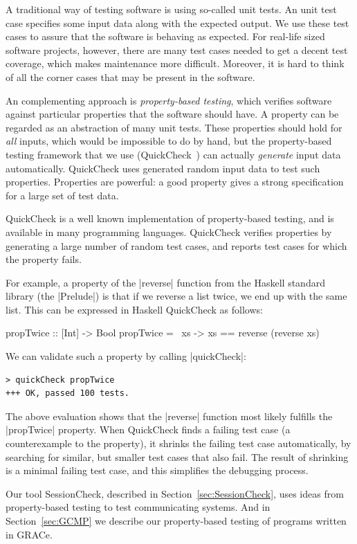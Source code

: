 \documentclass{article}
\begin{document}
A traditional way of testing software is using so-called unit tests.
%
An unit test case specifies some input data along with the expected
output.
%
We use these test cases to assure that the software is behaving as
expected.
%
For real-life sized software projects, however, there are many test
cases needed to get a decent test coverage, which makes maintenance
more difficult.
%
Moreover, it is hard to think of all the corner cases that may be
present in the software.

An complementing approach is \emph{property-based testing}, which
verifies software against particular properties that the software
should have.
%
A property can be regarded as an abstraction of many unit tests.
%
These properties should hold for \emph{all} inputs, which would be
impossible to do by hand, but the property-based testing framework
that we use (QuickCheck~\cite{QuickCheck}) can actually
\emph{generate} input data automatically.
%
QuickCheck uses generated random input data to test such properties.
%
Properties are powerful: a good property gives a strong specification
for a large set of test data.

QuickCheck is a well known implementation of property-based testing,
and is available in many programming languages.
%
QuickCheck verifies properties by generating a large number of random
test cases, and reports test cases for which the property fails.

For example, a property of the |reverse| function from the Haskell
standard library (the |Prelude|) is that if we reverse a list twice,
we end up with the same list.
%
This can be expressed in Haskell QuickCheck as follows:
%
\begin{haskellcode}
propTwice :: [Int] -> Bool
propTwice = \ xs -> xs == reverse (reverse xs)
\end{haskellcode}
%
We can validate such a property by calling |quickCheck|:
\begin{verbatim}
> quickCheck propTwice
+++ OK, passed 100 tests.
\end{verbatim}
The above evaluation shows that the |reverse| function most likely
fulfills the |propTwice| property.
%
When QuickCheck finds a failing test case (a counterexample to the
property), it shrinks the failing test case automatically, by
searching for similar, but smaller test cases that also fail.
%
The result of shrinking is a minimal failing test case, and this
simplifies the debugging process.

Our tool SessionCheck, described in Section~\ref{sec:SessionCheck},
uses ideas from property-based testing to test communicating systems.
%
And in Section~\ref{sec:GCMP} we describe our property-based testing
of programs written in GRACe.
\end{document}

